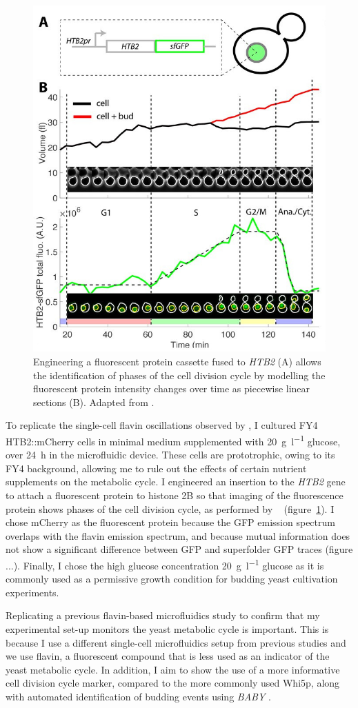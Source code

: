 \begin{figure}
  \centering
    \includegraphics[width=0.5\linewidth]{garmendia-torresMultipleInputsEnsure2018_1_adapted.jpg}
    \caption{
      Engineering a fluorescent protein cassette fused to \textit{HTB2} (A) allows the identification of phases of the cell division cycle by modelling the fluorescent protein intensity changes over time as piecewise linear sections (B).
      Adapted from \textcite{garmendia-torresMultipleInputsEnsure2018}.
    }
  \label{fig:biology-htb2}
\end{figure}

To replicate the single-cell flavin oscillations observed by \textcite{baumgartnerFlavinbasedMetabolicCycles2018}, I cultured FY4 HTB2::mCherry cells in minimal medium supplemented with \SI{20}{\gram~\litre^{-1}} glucose, over \SI{24}{\hour} in the microfluidic device.
These cells are prototrophic, owing to its FY4 background, allowing me to rule out the effects of certain nutrient supplements on the metabolic cycle.
I engineered an insertion to the \textit{HTB2} gene to attach a fluorescent protein to histone 2B so that imaging of the fluorescence protein shows phases of the cell division cycle, as performed by ~\textcite{garmendia-torresMultipleInputsEnsure2018} (figure~\ref{fig:biology-htb2}).
I chose mCherry as the fluorescent protein because the GFP emission spectrum overlaps with the flavin emission spectrum, and because mutual information does not show a significant difference between GFP and superfolder GFP traces (figure ...).
Finally, I chose the high glucose concentration \SI{20}{\gram~\litre^{-1}} glucose as it is commonly used as a permissive growth condition for budding yeast cultivation experiments.

Replicating a previous flavin-based microfluidics study to confirm that my experimental set-up monitors the yeast metabolic cycle is important.
This is because I use a different single-cell microfluidics setup from previous studies and we use flavin, a fluorescent compound that is less used as an indicator of the yeast metabolic cycle.
In addition, I aim to show the use of a more informative cell division cycle marker, compared to the more commonly used Whi5p, along with automated identification of budding events using \textit{BABY} \parencite{pietschDeterminingGrowthRates2023}.


